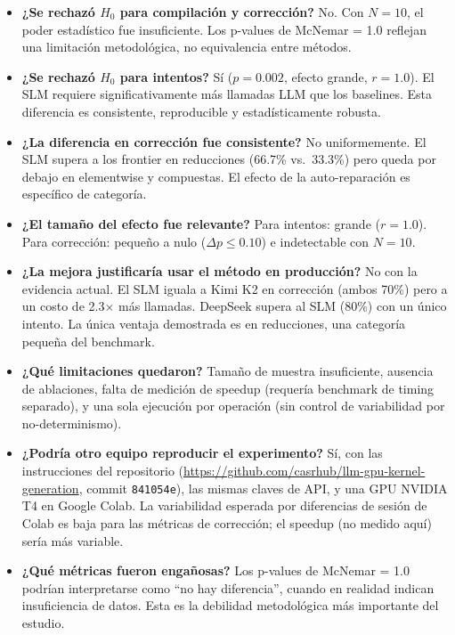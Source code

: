 \documentclass[12pt]{article}
\begin{document}
\begin{itemize}
  \item \textbf{¿Se rechazó $H_0$ para compilación y corrección?} No. Con $N=10$,
    el poder estadístico fue insuficiente. Los p-values de McNemar = 1.0 reflejan
    una limitación metodológica, no equivalencia entre métodos.

  \item \textbf{¿Se rechazó $H_0$ para intentos?} Sí ($p=0.002$, efecto grande,
    $r=1.0$). El SLM requiere significativamente más llamadas LLM que los baselines.
    Esta diferencia es consistente, reproducible y estadísticamente robusta.

  \item \textbf{¿La diferencia en corrección fue consistente?} No uniformemente.
    El SLM supera a los frontier en reducciones (66.7\% vs.\ 33.3\%) pero queda por
    debajo en elementwise y compuestas. El efecto de la auto-reparación es
    específico de categoría.

  \item \textbf{¿El tamaño del efecto fue relevante?} Para intentos: grande ($r=1.0$).
    Para corrección: pequeño a nulo ($\Delta p \leq 0.10$) e indetectable con $N=10$.

  \item \textbf{¿La mejora justificaría usar el método en producción?} No con la
    evidencia actual. El SLM iguala a Kimi K2 en corrección (ambos 70\%) pero a un
    costo de 2.3$\times$ más llamadas. DeepSeek supera al SLM (80\%) con un único
    intento. La única ventaja demostrada es en reducciones, una categoría pequeña del
    benchmark.

  \item \textbf{¿Qué limitaciones quedaron?} Tamaño de muestra insuficiente,
    ausencia de ablaciones, falta de medición de speedup (requería benchmark de
    timing separado), y una sola ejecución por operación (sin control de
    variabilidad por no-determinismo).

  \item \textbf{¿Podría otro equipo reproducir el experimento?} Sí, con las
    instrucciones del repositorio (\url{https://github.com/casrhub/llm-gpu-kernel-generation},
    commit \texttt{841054e}), las mismas claves de API, y una GPU NVIDIA T4 en Google Colab.
    La variabilidad esperada por diferencias de sesión de Colab es baja para las métricas
    de corrección; el speedup (no medido aquí) sería más variable.

  \item \textbf{¿Qué métricas fueron engañosas?} Los p-values de McNemar = 1.0 podrían
    interpretarse como ``no hay diferencia'', cuando en realidad indican insuficiencia de
    datos. Esta es la debilidad metodológica más importante del estudio.
\end{itemize}

\end{document}
